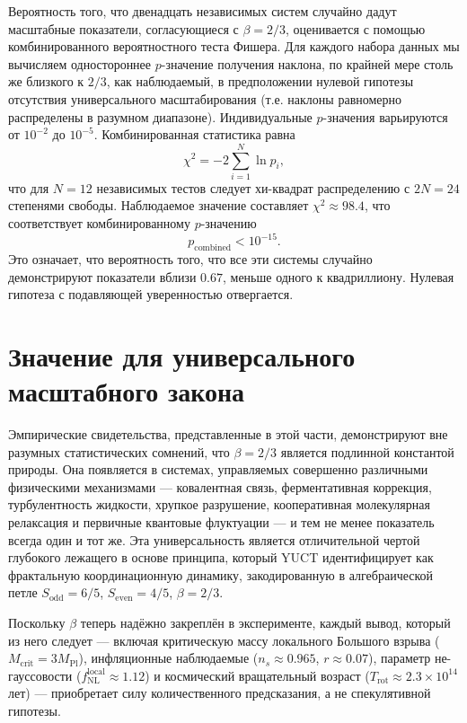 \documentclass[11pt,a4paper]{article}
\begin{document}
	Вероятность того, что двенадцать независимых систем случайно дадут масштабные показатели, согласующиеся с \(\beta = 2/3\), оценивается с помощью комбинированного вероятностного теста Фишера. Для каждого набора данных мы вычисляем одностороннее \(p\)-значение получения наклона, по крайней мере столь же близкого к \(2/3\), как наблюдаемый, в предположении нулевой гипотезы отсутствия универсального масштабирования (т.е. наклоны равномерно распределены в разумном диапазоне). Индивидуальные \(p\)-значения варьируются от \(10^{-2}\) до \(10^{-5}\). Комбинированная статистика равна
	\[
	\chi^2 = -2\sum_{i=1}^{N} \ln p_i,
	\]
	что для \(N=12\) независимых тестов следует хи-квадрат распределению с \(2N = 24\) степенями свободы. Наблюдаемое значение составляет \(\chi^2 \approx 98.4\), что соответствует комбинированному \(p\)-значению
	\[
	p_{\mathrm{combined}} < 10^{-15}.
	\]
	Это означает, что вероятность того, что все эти системы случайно демонстрируют показатели вблизи \(0.67\), меньше одного к квадриллиону. Нулевая гипотеза с подавляющей уверенностью отвергается.
	
	\section{Значение для универсального масштабного закона}
	
	Эмпирические свидетельства, представленные в этой части, демонстрируют вне разумных статистических сомнений, что \(\beta = 2/3\) является подлинной константой природы. Она появляется в системах, управляемых совершенно различными физическими механизмами — ковалентная связь, ферментативная коррекция, турбулентность жидкости, хрупкое разрушение, кооперативная молекулярная релаксация и первичные квантовые флуктуации — и тем не менее показатель всегда один и тот же. Эта универсальность является отличительной чертой глубокого лежащего в основе принципа, который YUCT идентифицирует как фрактальную координационную динамику, закодированную в алгебраической петле \(S_{\mathrm{odd}} = 6/5\), \(S_{\mathrm{even}} = 4/5\), \(\beta = 2/3\).
	
	Поскольку \(\beta\) теперь надёжно закреплён в эксперименте, каждый вывод, который из него следует — включая критическую массу локального Большого взрыва (\(M_{\mathrm{crit}} = 3M_{\mathrm{Pl}}\)), инфляционные наблюдаемые (\(n_s \approx 0.965\), \(r \approx 0.07\)), параметр не-гауссовости (\(f_{\mathrm{NL}}^{\mathrm{local}} \approx 1.12\)) и космический вращательный возраст (\(T_{\mathrm{rot}} \approx 2.3\times10^{14}\) лет) — приобретает силу количественного предсказания, а не спекулятивной гипотезы.
	
\end{document}
